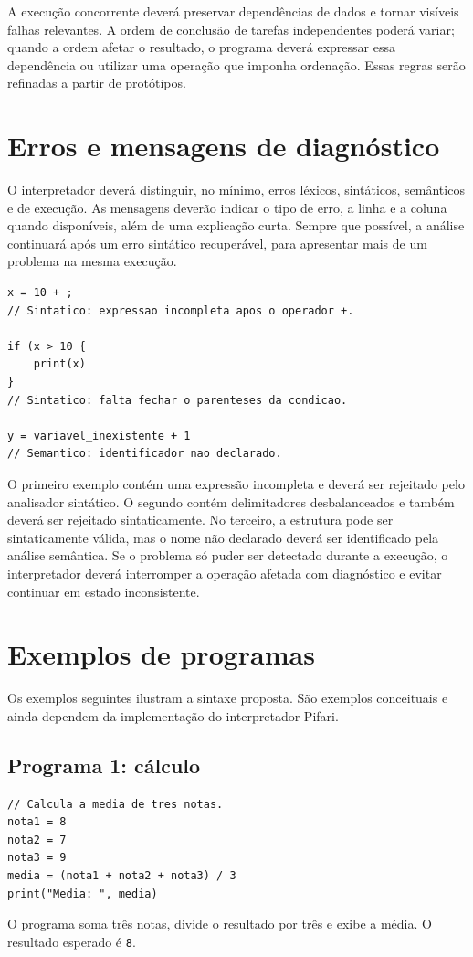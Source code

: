 \documentclass[12pt,a4paper]{article}
\begin{document}
A execução concorrente deverá preservar dependências de dados e tornar visíveis falhas relevantes. A ordem de conclusão de tarefas independentes poderá variar; quando a ordem afetar o resultado, o programa deverá expressar essa dependência ou utilizar uma operação que imponha ordenação. Essas regras serão refinadas a partir de protótipos.

\section{Erros e mensagens de diagnóstico}
O interpretador deverá distinguir, no mínimo, erros léxicos, sintáticos, semânticos e de execução. As mensagens deverão indicar o tipo de erro, a linha e a coluna quando disponíveis, além de uma explicação curta. Sempre que possível, a análise continuará após um erro sintático recuperável, para apresentar mais de um problema na mesma execução.

\begin{lstlisting}
x = 10 + ;
// Sintatico: expressao incompleta apos o operador +.

if (x > 10 {
    print(x)
}
// Sintatico: falta fechar o parenteses da condicao.

y = variavel_inexistente + 1
// Semantico: identificador nao declarado.
\end{lstlisting}

O primeiro exemplo contém uma expressão incompleta e deverá ser rejeitado pelo analisador sintático. O segundo contém delimitadores desbalanceados e também deverá ser rejeitado sintaticamente. No terceiro, a estrutura pode ser sintaticamente válida, mas o nome não declarado deverá ser identificado pela análise semântica. Se o problema só puder ser detectado durante a execução, o interpretador deverá interromper a operação afetada com diagnóstico e evitar continuar em estado inconsistente.

\section{Exemplos de programas}
Os exemplos seguintes ilustram a sintaxe proposta. São exemplos conceituais e ainda dependem da implementação do interpretador Pifari.

\subsection{Programa 1: cálculo}
\begin{lstlisting}
// Calcula a media de tres notas.
nota1 = 8
nota2 = 7
nota3 = 9
media = (nota1 + nota2 + nota3) / 3
print("Media: ", media)
\end{lstlisting}
O programa soma três notas, divide o resultado por três e exibe a média. O resultado esperado é \texttt{8}.
\end{document}
